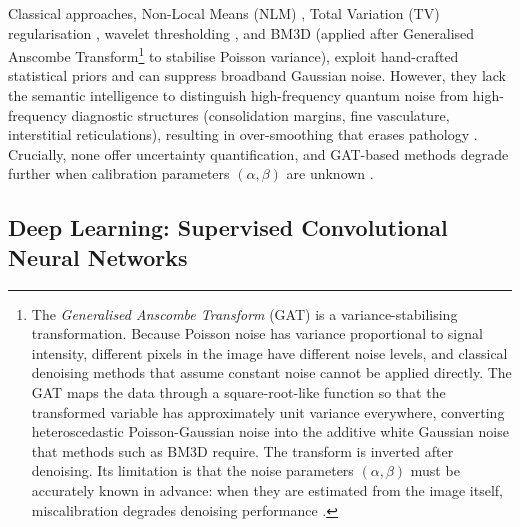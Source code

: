 \documentclass[12pt, a4paper, twoside, openright]{book}
\begin{document}
Classical approaches, Non-Local Means (NLM) \cite{buades_non-local_2005}, Total Variation (TV) regularisation \cite{rudin_nonlinear_1992}, wavelet thresholding \cite{donoho_ideal_1994}, and BM3D \cite{dabov_image_2007} (applied after Generalised Anscombe Transform\footnote{The \emph{Generalised Anscombe Transform} (GAT) \cite{makitalo_optimal_2013} is a variance-stabilising transformation. Because Poisson noise has variance proportional to signal intensity, different pixels in the image have different noise levels, and classical denoising methods that assume constant noise cannot be applied directly. The GAT maps the data through a square-root-like function so that the transformed variable has approximately unit variance everywhere, converting heteroscedastic Poisson-Gaussian noise into the additive white Gaussian noise that methods such as BM3D require. The transform is inverted after denoising. Its limitation is that the noise parameters $(\alpha, \beta)$ must be accurately known in advance: when they are estimated from the image itself, miscalibration degrades denoising performance \cite{borges_noise_2020}.} to stabilise Poisson variance), exploit hand-crafted statistical priors and can suppress broadband Gaussian noise. However, they lack the semantic intelligence to distinguish high-frequency quantum noise from high-frequency diagnostic structures (consolidation margins, fine vasculature, interstitial reticulations), resulting in over-smoothing that erases pathology \cite{rudin_nonlinear_1992}. Crucially, none offer uncertainty quantification, and GAT-based methods degrade further when calibration parameters $(\alpha,\beta)$ are unknown \cite{borges_noise_2020}.

\subsection{Deep Learning: Supervised Convolutional Neural Networks}
\label{sec:intro:existing:cnn}
\end{document}
